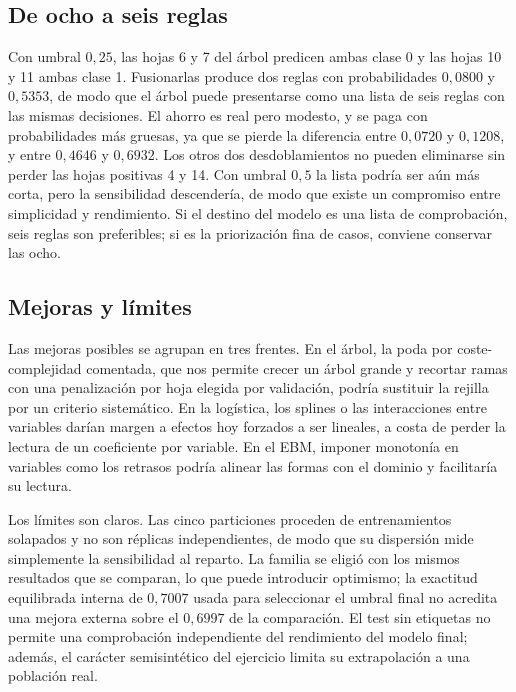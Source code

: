 \subsection{De ocho a seis reglas}

Con umbral $0{,}25$, las hojas 6 y 7 del árbol predicen ambas clase 0 y las hojas 10 y 11 ambas clase 1. Fusionarlas produce dos reglas con probabilidades $0{,}0800$ y $0{,}5353$, de modo que el árbol puede presentarse como una lista de seis reglas con las mismas decisiones. El ahorro es real pero modesto, y se paga con probabilidades más gruesas, ya que se pierde la diferencia entre $0{,}0720$ y $0{,}1208$, y entre $0{,}4646$ y $0{,}6932$. Los otros dos desdoblamientos no pueden eliminarse sin perder las hojas positivas 4 y 14. Con umbral $0{,}5$ la lista podría ser aún más corta, pero la sensibilidad descendería, de modo que existe un compromiso entre simplicidad y rendimiento. Si el destino del modelo es una lista de comprobación, seis reglas son preferibles; si es la priorización fina de casos, conviene conservar las ocho.

\subsection{Mejoras y límites}

Las mejoras posibles se agrupan en tres frentes. En el árbol, la poda por coste-complejidad comentada, que nos permite crecer un árbol grande y recortar ramas con una penalización por hoja elegida por validación, podría sustituir la rejilla por un criterio sistemático. En la logística, los splines o las interacciones entre variables darían margen a efectos hoy forzados a ser lineales, a costa de perder la lectura de un coeficiente por variable. En el EBM, imponer monotonía en variables como los retrasos podría alinear las formas con el dominio y facilitaría su lectura.


Los límites son claros. Las cinco particiones proceden de entrenamientos solapados y no son réplicas independientes, de modo que su dispersión mide simplemente la sensibilidad al reparto. La familia se eligió con los mismos resultados que se comparan, lo que puede introducir optimismo; la exactitud equilibrada interna de $0{,}7007$ usada para seleccionar el umbral final no acredita una mejora externa sobre el $0{,}6997$ de la comparación. El test sin etiquetas no permite una comprobación independiente del rendimiento del modelo final; además, el carácter semisintético del ejercicio limita su extrapolación a una población real.
